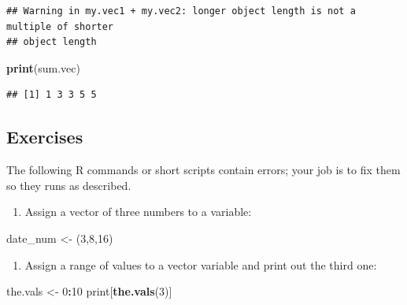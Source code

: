 \documentclass[
]{book}
\newenvironment{Shaded}{\begin{snugshade}}{\end{snugshade}}
\newcommand{\DecValTok}[1]{\textcolor[rgb]{0.00,0.00,0.81}{#1}}
\newcommand{\KeywordTok}[1]{\textcolor[rgb]{0.13,0.29,0.53}{\textbf{#1}}}
\newcommand{\NormalTok}[1]{#1}
\newcommand{\OperatorTok}[1]{\textcolor[rgb]{0.81,0.36,0.00}{\textbf{#1}}}
\newcommand{\StringTok}[1]{\textcolor[rgb]{0.31,0.60,0.02}{#1}}
\providecommand{\tightlist}{%
  \setlength{\itemsep}{0pt}\setlength{\parskip}{0pt}}
\begin{document}
\begin{verbatim}
## Warning in my.vec1 + my.vec2: longer object length is not a multiple of shorter
## object length
\end{verbatim}

\begin{Shaded}
\begin{Highlighting}[]
\KeywordTok{print}\NormalTok{(sum.vec)}
\end{Highlighting}
\end{Shaded}

\begin{verbatim}
## [1] 1 3 3 5 5
\end{verbatim}

\hypertarget{exercises-3}{%
\subsection{Exercises}\label{exercises-3}}

The following R commands or short scripts contain errors; your job is to fix them so they runs as described.

\begin{enumerate}
\def\labelenumi{\arabic{enumi}.}
\tightlist
\item
  Assign a vector of three numbers to a variable:
\end{enumerate}

\begin{Shaded}
\begin{Highlighting}[]
\NormalTok{date\_num \textless{}{-}}\StringTok{ }\NormalTok{(}\DecValTok{3}\NormalTok{,}\DecValTok{8}\NormalTok{,}\DecValTok{16}\NormalTok{)}
\end{Highlighting}
\end{Shaded}

\begin{enumerate}
\def\labelenumi{\arabic{enumi}.}
\setcounter{enumi}{1}
\tightlist
\item
  Assign a range of values to a vector variable and print out the third one:
\end{enumerate}

\begin{Shaded}
\begin{Highlighting}[]
\NormalTok{the.vals \textless{}{-}}\StringTok{ }\DecValTok{0}\OperatorTok{:}\DecValTok{10}
\NormalTok{print[}\KeywordTok{the.vals}\NormalTok{(}\DecValTok{3}\NormalTok{)]}
\end{Highlighting}
\end{Shaded}
\end{document}
